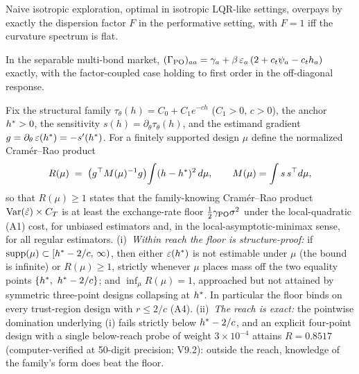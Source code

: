 \documentclass[11pt]{article}
\begin{document}
\begin{proposition}
Naive isotropic exploration, optimal in isotropic LQR-like settings,
overpays by exactly the dispersion factor $F$ in the performative
setting, with $F = 1$ iff the curvature spectrum is flat.
\end{proposition}

\begin{proposition}
In the separable multi-bond market,
$(\Gamma_{\mathrm{PO}})_{aa} = \gamma_a + \beta\,\varepsilon_a\,(2 + c_t\psi_a - c_t h_a)$
exactly, with the factor-coupled case holding to first order in the
off-diagonal response.
\end{proposition}

\begin{theorem}
Fix the structural family $\tau_\theta(h) = C_0 + C_1 e^{-ch}$
($C_1 > 0$, $c > 0$), the anchor $h^{*} > 0$, the sensitivity
$s(h) = \partial_\theta \tau_\theta(h)$, and the estimand gradient
$g = \partial_\theta\,\varepsilon(h^{*}) = -s'(h^{*})$. For a finitely
supported design $\mu$ define the normalized Cram\'er--Rao product
\[
R(\mu) \;=\; \big(g^\top M(\mu)^{-1} g\big)\!\int (h - h^{*})^2\,
d\mu, \qquad M(\mu) = \int s\,s^\top d\mu,
\]
so that $R(\mu) \ge 1$ states that the family-knowing Cram\'er--Rao
product $\operatorname{Var}(\hat{\varepsilon})\times C_T$ is at least the exchange-rate floor
$\tfrac{1}{2}\gamma_{\mathrm{PO}}\sigma^2$ under the local-quadratic (A1) cost, for
unbiased estimators and, in the local-asymptotic-minimax sense, for all
regular estimators.
(i)~\emph{Within reach the floor is structure-proof:} if
$\mathrm{supp}(\mu) \subset [h^{*} - 2/c,\,\infty)$, then either
$\varepsilon(h^{*})$ is not estimable under $\mu$ (the bound is infinite) or
$R(\mu) \ge 1$, strictly whenever $\mu$ places mass off the two
equality points $\{h^{*},\ h^{*} - 2/c\}$; and $\inf_\mu R(\mu) = 1$,
approached but not attained by symmetric three-point designs collapsing
at $h^{*}$. In particular the floor binds on every trust-region design
with $r \le 2/c$ (A4).
(ii)~\emph{The reach is exact:} the pointwise domination underlying (i)
fails strictly below $h^{*} - 2/c$, and an explicit four-point design
with a single below-reach probe of weight $3\times 10^{-4}$ attains
$R = 0.8517$ (computer-verified at 50-digit precision; V9.2): outside
the reach, knowledge of the family's form does beat the floor.
\end{theorem}

\end{document}
